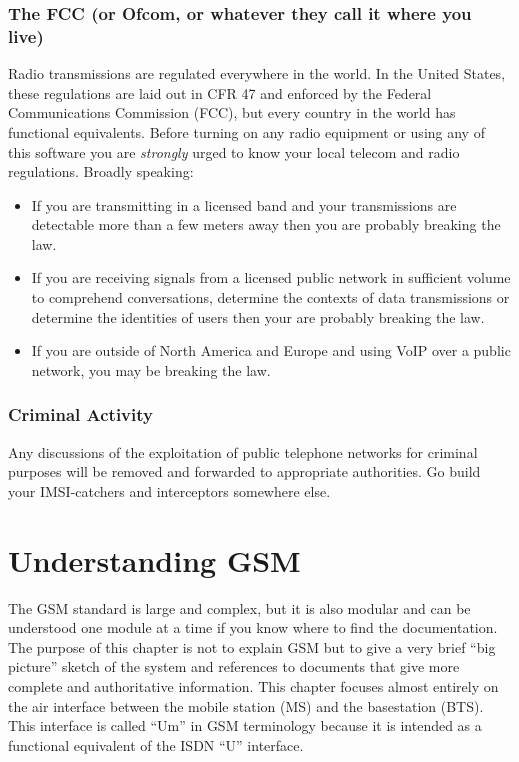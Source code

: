 \documentclass[11pt]{book}
\begin{document}
\subsection{The FCC (or Ofcom, or whatever they call it where you live)}
Radio transmissions are regulated everywhere in the world. In the United States, these regulations are laid out in CFR 47 and enforced by the Federal Communications Commission (FCC), but every country in the world has functional equivalents. Before turning on any radio equipment or using any of this software you are \emph{strongly} urged to know your local telecom and radio regulations. Broadly speaking:
\begin{itemize}
	\item If you are transmitting in a licensed band and your transmissions are detectable more than a few meters away then you are probably breaking the law.
	\item If you are receiving signals from a licensed public network in sufficient volume to comprehend conversations, determine the contexts of data transmissions or determine the identities of users then your are probably breaking the law.
	\item If you are outside of North America and Europe and using VoIP over a public network, you may be breaking the law.
\end{itemize}


\subsection{Criminal Activity}
Any discussions of the exploitation of public telephone networks for criminal purposes will be removed and forwarded to appropriate authorities.  Go build your IMSI-catchers and interceptors somewhere else.






\chapter{Understanding GSM}
The GSM standard is large and complex, but it is also modular and can be understood one module at a time if you know where to find the documentation.  The purpose of this chapter is not to explain GSM but to give a very brief ``big picture'' sketch of the system and references to documents that give more complete and authoritative information.  This chapter focuses almost entirely on the air interface between the mobile station (MS) and the basestation (BTS).  This interface is called ``Um'' in GSM terminology because it is intended as a functional equivalent of the ISDN ``U'' interface.
\end{document}
